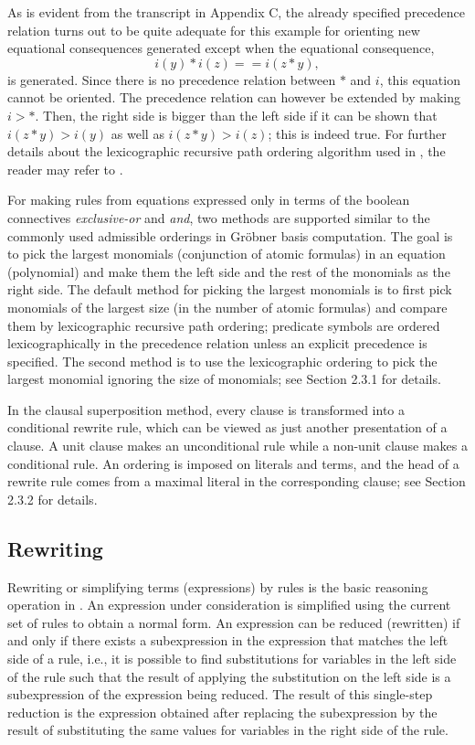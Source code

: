 As is evident from the transcript in Appendix C,
the already specified precedence relation turns out to be quite
adequate for this example for orienting
new equational consequences generated except
when the equational consequence,
  \[ i(y) * i(z) == i(z * y), \]
is generated. Since there is no precedence relation between 
$*$ and $i$, this equation cannot be oriented. The precedence
relation can however be extended by making $i>*$. Then, the right side
is bigger than the left side if it can be shown that
$i(z * y) > i(y)$ as well as $i(z * y) > i(z)$;
this is indeed true. For further details about the
lexicographic recursive path ordering algorithm used in \ERRL, the reader
may refer to \cite{Dershowitz82,KaminLevy}.

For making rules from equations expressed only in terms of the boolean
connectives {\em exclusive-or} and {\em and}, two methods are
supported similar to the commonly used admissible orderings in Gr\"{o}bner
basis computation.  The goal is to pick the largest monomials
(conjunction of atomic formulas) in an equation (polynomial) and make
them the left side and the rest of the monomials as the
right side.  The default method for picking the largest monomials
is to first pick monomials of the largest size (in the number of
atomic formulas) and compare them by lexicographic recursive path
ordering; predicate symbols are ordered lexicographically in the
precedence relation unless an explicit precedence is specified.  The
second method is to use the lexicographic ordering to pick the largest
monomial ignoring the size of monomials; 
see Section 2.3.1
for details.

In the clausal superposition method, 
every clause is transformed into a conditional rewrite
rule, which can be viewed as just another presentation of a
clause.  A unit clause makes an unconditional rule while a
non-unit clause makes a conditional rule. An ordering is imposed
on literals and terms, and the head of a rewrite rule comes from
a maximal literal in the corresponding clause; see Section 2.3.2
for details.

\subsection{Rewriting}
Rewriting or simplifying terms (expressions) by rules is the basic
reasoning operation in \ERRL. An expression under consideration is
simplified using the current set of rules to obtain a normal form.  An
expression can be reduced (rewritten) if and only if there exists a
subexpression in the expression that matches the left side of a
rule, i.e., it is possible to find substitutions for variables in the
left side of the rule such that the result
of applying the substitution on the left side is
a subexpression of the expression being reduced. The result of this
single-step reduction is the expression obtained after replacing the
subexpression by the result of substituting the same values for
variables in the right side of the rule.
  
